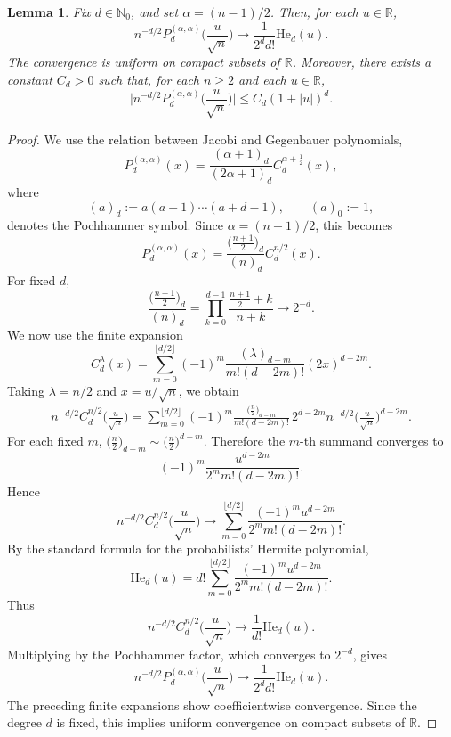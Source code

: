 \documentclass[11pt,showkeys]{amsart}
\newtheorem{lemma}[theorem]{Lemma}
\begin{document}
\begin{lemma}
\label{lem:jacobi-hermite-limit}
Fix $d\in\mathbb N_0$, and set $\alpha=(n-1)/2$. Then, for each
$u\in\mathbb R$,
\[
n^{-d/2}
P_d^{(\alpha,\alpha)}
\bigg(\frac{u}{\sqrt n}\bigg)
\longrightarrow
\frac{1}{2^d d!}\mathrm{He}_d(u).
\]
The convergence is uniform on compact subsets of $\mathbb R$. Moreover, there
exists a constant $C_d>0$ such that, for each $n\geq2$ and each
$u\in\mathbb R$,
\[
\bigg|
n^{-d/2}
P_d^{(\alpha,\alpha)}
\bigg(\frac{u}{\sqrt n}\bigg)
\bigg|
\leq
C_d(1+|u|)^d.
\]
\end{lemma}

\begin{proof}
We use the relation between Jacobi and Gegenbauer polynomials,
\[
P_d^{(\alpha,\alpha)}(x)
=
\frac{(\alpha+1)_d}{(2\alpha+1)_d}
C_d^{\alpha+\frac12}(x),
\]
where
\[
(a)_d:=a(a+1)\cdots(a+d-1),
\qquad
(a)_0:=1,
\]
denotes the Pochhammer symbol. Since $\alpha=(n-1)/2$, this becomes
\[
P_d^{(\alpha,\alpha)}(x)
=
\frac{\bigl(\frac{n+1}{2}\bigr)_d}{(n)_d}
C_d^{n/2}(x).
\]
For fixed $d$,
\[
\frac{\bigl(\frac{n+1}{2}\bigr)_d}{(n)_d}
=
\prod_{k=0}^{d-1}
\frac{\frac{n+1}{2}+k}{n+k}
\longrightarrow
2^{-d}.
\]
We now use the finite expansion
\[
C_d^\lambda(x)
=
\sum_{m=0}^{\lfloor d/2\rfloor}
(-1)^m
\frac{(\lambda)_{d-m}}{m!(d-2m)!}
(2x)^{d-2m}.
\]
Taking $\lambda=n/2$ and $x=u/\sqrt n$, we obtain
\[
\begin{split}
n^{-d/2}
C_d^{n/2}\bigg(\frac{u}{\sqrt n}\bigg)
=
\sum_{m=0}^{\lfloor d/2\rfloor}
(-1)^m
\frac{\bigl(\frac n2\bigr)_{d-m}}{m!(d-2m)!}\,
2^{d-2m}n^{-d/2}
\bigg(\frac{u}{\sqrt n}\bigg)^{d-2m}.
\end{split}
\]
For each fixed $m$,
\(
\bigl(\tfrac n2\bigr)_{d-m}
\sim
\bigg(\frac n2\bigg)^{d-m}.
\)
Therefore the $m$-th summand converges to
\[
(-1)^m
\frac{u^{d-2m}}{2^m m!(d-2m)!}.
\]
Hence
\[
n^{-d/2}
C_d^{n/2}\bigg(\frac{u}{\sqrt n}\bigg)
\longrightarrow
\sum_{m=0}^{\lfloor d/2\rfloor}
\frac{(-1)^m u^{d-2m}}
{2^m m!(d-2m)!}.
\]
By the standard formula for the probabilists' Hermite polynomial,
\[
\mathrm{He}_d(u)
=
d!
\sum_{m=0}^{\lfloor d/2\rfloor}
\frac{(-1)^m u^{d-2m}}
{2^m m!(d-2m)!}.
\]
Thus
\[
n^{-d/2}
C_d^{n/2}\bigg(\frac{u}{\sqrt n}\bigg)
\longrightarrow
\frac{1}{d!}\mathrm{He}_d(u).
\]
Multiplying by the Pochhammer factor, which converges to $2^{-d}$, gives
\[
n^{-d/2}
P_d^{(\alpha,\alpha)}
\bigg(\frac{u}{\sqrt n}\bigg)
\longrightarrow
\frac{1}{2^d d!}\mathrm{He}_d(u).
\]
The preceding finite expansions show coefficientwise convergence.
Since the degree \(d\) is fixed, this implies uniform convergence on
compact subsets of \(\mathbb R\).


\end{proof}
\end{document}
